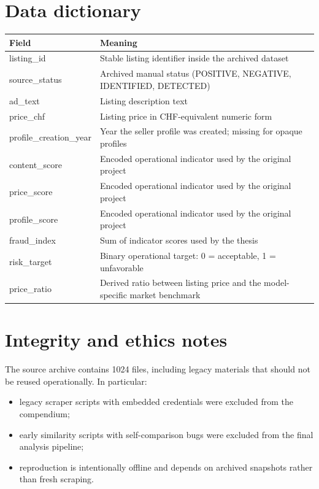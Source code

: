 \documentclass[11pt,a4paper]{article}
\begin{document}
\section{Data dictionary}
\begin{tabularx}{\textwidth}{p{4.0cm} X}
\toprule
Field & Meaning \\
\midrule
listing\_id & Stable listing identifier inside the archived dataset \\
source\_status & Archived manual status (POSITIVE, NEGATIVE, IDENTIFIED, DETECTED) \\
ad\_text & Listing description text \\
price\_chf & Listing price in CHF-equivalent numeric form \\
profile\_creation\_year & Year the seller profile was created; missing for opaque profiles \\
content\_score  & Encoded operational indicator used by the original project \\
price\_score  & Encoded operational indicator used by the original project \\
profile\_score & Encoded operational indicator used by the original project \\
fraud\_index & Sum of indicator scores used by the thesis \\
risk\_target & Binary operational target: 0 = acceptable, 1 = unfavorable \\
price\_ratio & Derived ratio between listing price and the model-specific market benchmark \\
\bottomrule
\end{tabularx}

\section{Integrity and ethics notes}
The source archive contains 1024 files, including legacy materials that should not be reused operationally. In particular:
\begin{itemize}[leftmargin=1.5em]
    \item legacy scraper scripts with embedded credentials were excluded from the compendium;
    \item early similarity scripts with self-comparison bugs were excluded from the final analysis pipeline;
    \item reproduction is intentionally offline and depends on archived snapshots rather than fresh scraping.
\end{itemize}
\end{document}
